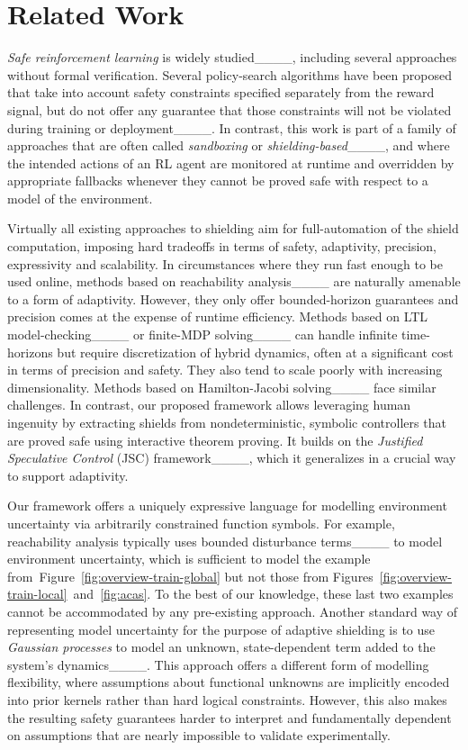 \section{Related Work}
\emph{Safe reinforcement learning} is widely studied____, including several approaches without formal verification. Several policy-search algorithms have been proposed that take into account safety constraints specified separately from the reward signal, but do not offer any guarantee that those constraints will not be violated during training or deployment____. In contrast, this work is part of a family of approaches that are often called \emph{sandboxing} or \emph{shielding-based}____, and where the intended actions of an RL agent are monitored at runtime and overridden by appropriate fallbacks whenever they cannot be proved safe with respect to a model of the environment.

Virtually all existing approaches to shielding aim for full-automation of the shield computation, imposing hard tradeoffs in terms of safety, adaptivity, precision, expressivity and scalability. In circumstances where they run fast enough to be used online, methods based on reachability analysis____ are naturally amenable to a form of adaptivity. However, they only offer bounded-horizon guarantees and precision comes at the expense of runtime efficiency. Methods based on LTL model-checking____ or finite-MDP solving____ can handle infinite time-horizons but require discretization of hybrid dynamics, often at a significant cost in terms of precision and safety. They also tend to scale poorly with increasing dimensionality. Methods based on Hamilton-Jacobi solving____ face similar challenges. In contrast, our proposed framework allows leveraging human ingenuity by extracting shields from nondeterministic, symbolic controllers that are proved safe using interactive theorem proving. It builds on the \emph{Justified Speculative Control} (JSC) framework____, which it generalizes in a crucial way to support adaptivity.

Our framework offers a uniquely expressive language for modelling environment uncertainty via arbitrarily constrained function symbols. For example, reachability analysis typically uses {bounded disturbance terms}____ to model environment uncertainty, which is sufficient to model the example from~Figure~\ref{fig:overview-train-global} but not those from Figures~\ref{fig:overview-train-local}~and~\ref{fig:acas}. To the best of our knowledge, these last two examples cannot be accommodated by any pre-existing approach. Another standard way of representing model uncertainty for the purpose of adaptive shielding is to use \emph{Gaussian processes} to model an unknown, state-dependent term added to the system's dynamics____. This approach offers a different form of modelling flexibility, where assumptions about functional unknowns are implicitly encoded into prior kernels rather than hard logical constraints. However, this also makes the resulting safety guarantees harder to interpret and fundamentally dependent on assumptions that are nearly impossible to validate experimentally.

